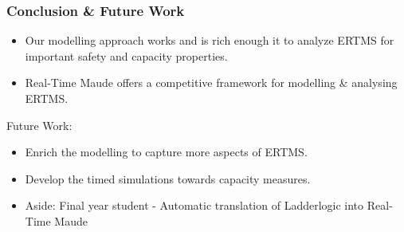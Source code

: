 \documentclass{beamer}
\begin{document}
\begin{frame}
\frametitle{Conclusion \& Future Work}


\begin{itemize}



\item Our modelling approach works and is rich enough it to analyze ERTMS for
  important safety and capacity properties.

\item Real-Time Maude offers a competitive framework for modelling \&
 analysing ERTMS.
\medskip


\end{itemize} %


Future Work:
\begin{itemize}


\item Enrich the modelling to capture more aspects of ERTMS.
\item Develop the timed simulations towards capacity measures.


\bigskip

\item Aside: Final year student - Automatic translation of Ladderlogic into Real-Time Maude


\end{itemize}

\end{frame}
\end{document}
